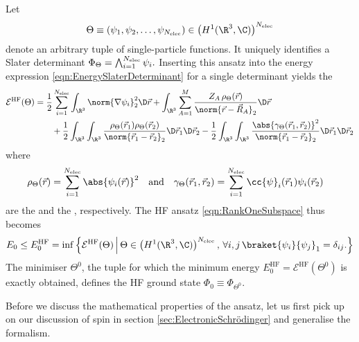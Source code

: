 \begin{rem}
	Let
	\[  \Theta \equiv \left(\psi_1, \psi_2, \ldots, \psi_{\Nelec}\right)
		\in \left(H^1(\R^3, \C)\right)^{\Nelec} \]
	denote an arbitrary tuple of single-particle functions.
	It uniquely identifies a Slater determinant
	$\Phi_\Theta = \bigwedge_{i=1}^{N_\text{elec}} \psi_i.$
	Inserting this ansatz into the energy expression
	\eqref{eqn:EnergySlaterDeterminant} for a single determinant
	yields the 
	\begin{equation}
		\begin{aligned}
		\mathcal{E}^\text{HF}(\Theta)
		&= \frac12 \sum_{i=1}^{\Nelec} \int_{\R^3} \norm{\nabla \psi_i}_2^2 \D\vec{r}
		+ \int_{\R^3} \sum_{A=1}^M
			\frac{Z_A \, \rho_\Theta(\vec{r})}{\norm{\vec{r} - \vec{R}_A}_2} \D\vec{r} \\
		&\hspace{20pt}
		+ \frac12 \int_{\R^3}\int_{\R^3}
			\frac{\rho_\Theta(\vec{r}_1) \rho_\Theta(\vec{r}_2)}
				{\norm{\vec{r}_1 - \vec{r}_2}_2} \D\vec{r}_1 \D\vec{r}_2
		- \frac12 \int_{\R^3}\int_{\R^3}
			\frac{\abs{\gamma_\Theta(\vec{r}_1, \vec{r}_2)}^2}
				{\norm{\vec{r}_1 - \vec{r}_2}_2} \D\vec{r}_1 \D\vec{r}_2
		\end{aligned}
		\label{eqn:HFEnergyFunctional}
	\end{equation}
	where
	\begin{align}
		\label{eqn:HFDensityNoSpin}
		\rho_\Theta(\vec{r}) &= \sum_{i=1}^{\Nelec} \abs{\psi_i(\vec{r})}^2
		&\text{and} &&
		\gamma_\Theta(\vec{r}_1,\vec{r}_2)
			&= \sum_{i=1}^{\Nelec} \cc{\psi}_i(\vec{r}_1) \psi_i(\vec{r}_2)
	\end{align}
	are the 
	and the , respectively.
	The HF ansatz \eqref{eqn:RankOneSubspace}
	thus becomes
	\begin{equation}
		E_0 \leq E_0^\text{HF}
		= \inf \left\{
			\mathcal{E}^\text{HF}(\Theta)
			\, \middle| \,
			\Theta \in \left(H^1(\R^3, \C)\right)^{\Nelec}, \,
			\forall i,j \,
			\braket{\psi_i}{\psi_j}_1 = \delta_{ij}.
		\right\}
		\label{eqn:HFMO}
	\end{equation}
	The minimiser $\Theta^0$, \ie the tuple for which the minimum
	energy $E_0^\text{HF} = \mathcal{E}^\text{HF}(\Theta^0)$
	is exactly obtained,
	defines the HF ground state
	$\Phi_0 \equiv \Phi_{\Theta^0}$.
\end{rem}

Before we discuss the mathematical properties of the \HF ansatz,
let us first pick up on our discussion
of spin in section \vref{sec:ElectronicSchrödinger}
and generalise the formalism.

